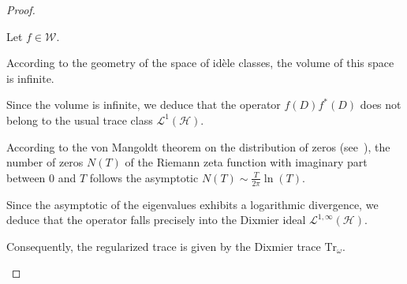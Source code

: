 \documentclass[Riemann_Hypothesis.tex]{subfiles}
\begin{document}
\begin{proof}
    \begin{part_proof}
        Let $f \in \mathcal{W}$. \par
        According to the geometry of the space of idèle classes, the volume of this space is infinite. \par
        Since the volume is infinite, we deduce that the operator $f(D)f^*(D)$ does not belong to the usual trace class $\mathcal{L}^1(\mathcal{H})$. \par
        According to the von Mangoldt theorem on the distribution of zeros (see~\cite{von-Manglot_tenenbaum2015_intro_en}), the number of zeros $N(T)$ of the Riemann zeta function with imaginary part between $0$ and $T$ follows the asymptotic $N(T) \sim \frac{T}{2\pi}\ln(T)$. \par
        Since the asymptotic of the eigenvalues exhibits a logarithmic divergence, we deduce that the operator falls precisely into the Dixmier ideal $\mathcal{L}^{1,\infty}(\mathcal{H})$. \par
        Consequently, the regularized trace is given by the Dixmier trace $\mathrm{Tr}_\omega$.
    \end{part_proof}


\end{proof}
\end{document}
